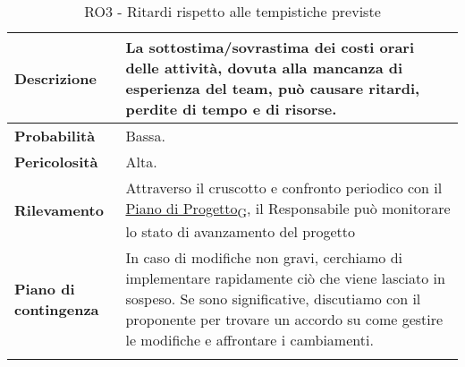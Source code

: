 \begin{longtable}{ | l | p{10cm} | }
	\hline
	\textbf{Descrizione}          & La sottostima/sovrastima dei costi orari delle attività, dovuta alla mancanza di esperienza del team, può causare ritardi, perdite di tempo e di risorse.                                                                                                \\
	\hline
	\textbf{Probabilità}          & Bassa.                                                                                                                                                                                                                                                   \\
	\hline
	\textbf{Pericolosità}         & Alta.                                                                                                                                                                                                                                                    \\
	\hline
	\textbf{Rilevamento}          & Attraverso il cruscotto e confronto periodico con il \href{https://7last.github.io/docs/rtb/documentazione-interna/glossario#piano-di-progetto}{Piano di Progetto\textsubscript{G}}, il Responsabile può monitorare lo stato di avanzamento del progetto \\
	\hline
	\textbf{Piano di contingenza} & In caso di modifiche non gravi, cerchiamo di implementare rapidamente ciò che viene lasciato in sospeso. Se sono significative, discutiamo con il proponente per trovare un accordo su come gestire le modifiche e affrontare i cambiamenti.             \\
	\hline
	\caption{RO3 - Ritardi rispetto alle tempistiche previste}
	\label{table:3}
\end{longtable}

